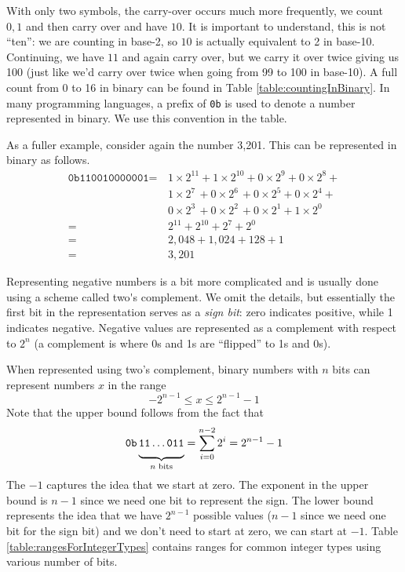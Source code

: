 With only two symbols, the carry-over occurs much more frequently, 
we count $0, 1$ and then carry over and have $10$.  It is important to understand, this
is not ``ten'': we are counting in base-2, so $10$ is actually equivalent to 2 in base-10.
Continuing, we have $11$ and again carry over, but we carry it over twice giving us
100 (just like we'd carry over twice when going from 99 to 100 in base-10).
A full count from 0 to 16 in binary can be found in Table \ref{table:countingInBinary}.
In many programming languages, a prefix of \texttt{0b} is used to denote a number
represented in binary.  We use this convention in the table.  

As a fuller example, consider again the number 3,201.  This can be 
represented in binary as follows.
\begin{align*}
  \texttt{0b110010000001} = \, & 1 \times 2^{11} + 1 \times 2^{10} + 0 \times 2^{9} + 0 \times 2^{8} + \\
   & 1 \times 2^{7~} + 0 \times 2^{6~} + 0 \times 2^{5} + 0 \times 2^{4} + \\
   & 0 \times 2^{3~} + 0 \times 2^{2~} + 0 \times 2^{1} + 1 \times 2^{0} \\
   = \, & 2^{11} + 2^{10} + 2^{7} + 2^{0} \\
   = \, & 2,048 + 1,024 + 128 + 1 \\
   = \, & 3,201
\end{align*}

Representing negative numbers is a bit more complicated and is usually done
using a scheme called  \gls{two's complement}.  We 
omit the details, but essentially the first bit in the 
representation serves as a \emph{sign bit}: zero indicates 
positive, while 1 indicates negative.  Negative values are represented as a complement
with respect to $2^n$ (a complement is where 0s and 1s are ``flipped'' to 1s and 0s).

When represented using two's complement, binary numbers with $n$ bits can represent
numbers $x$ in the range
  $$-2^{n-1} \leq x \leq 2^{n-1}-1$$
Note that the upper bound follows from the fact that 
  $$\texttt{0b}\underbrace{ \vphantom{\frac{A}{B}} \texttt{11}\ldots \texttt{011}}_{n \textrm{ bits}} = \sum_{i=0}^{n-2} 2^i = 2^{n-1} -1$$
The $-1$ captures the idea that we start at zero.  The exponent in 
the upper bound is $n-1$ since we need one bit to represent the sign.
The lower bound represents the idea that we have $2^{n-1}$ possible values ($n-1$ since we need one bit for the sign bit) 
and we don't need to start at zero, we can start at $-1$.  Table \ref{table:rangesForIntegerTypes}
contains ranges for common integer types using various number of bits.

